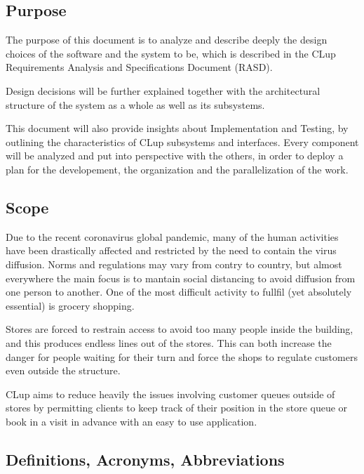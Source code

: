 \subsection{Purpose}
The purpose of this document is to analyze and describe deeply the design choices of the software and the system to be, which is described in the CLup Requirements Analysis and Specifications Document (RASD).


Design decisions will be further explained together with the architectural structure of the system as a whole as well as its subsystems.

\medskip

This document will also provide insights about Implementation and Testing, by outlining the characteristics of CLup subsystems and interfaces. Every component will be analyzed and put into perspective with the others, in order to deploy a plan for the developement, the organization and the parallelization of the work.

\subsection{Scope}

Due to the recent coronavirus global pandemic, many of the human activities have been drastically affected and restricted by the need to contain the virus diffusion. Norms and regulations may vary from contry to country, but almost everywhere the main focus is to mantain social distancing to avoid diffusion from one person to another.
One of the most difficult activity to fullfil (yet absolutely essential) is grocery shopping.
\medskip

Stores are forced to restrain access to avoid too many people inside the building, and this produces endless lines out of the stores. This can both increase the danger for people waiting for their turn and force the shops to regulate customers even outside the structure.

\medskip

CLup aims to reduce heavily the issues involving customer queues outside of stores by permitting clients to keep track of their position in the store queue or book in a visit in advance with an easy to use application.

\clearpage
\subsection{Definitions, Acronyms, Abbreviations}

